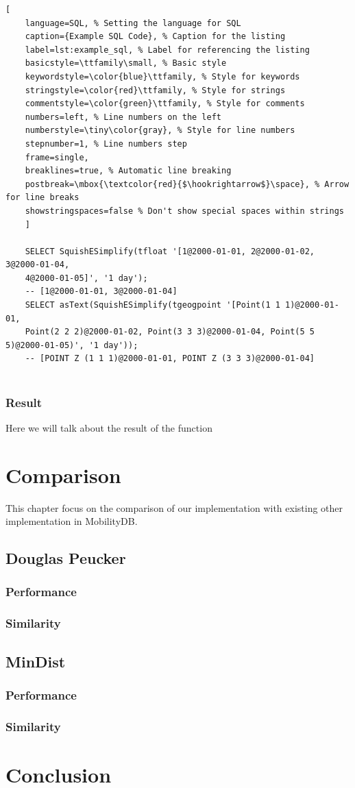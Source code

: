\documentclass[twoside,12pt, a4paper]{report}
\begin{document}
\begin{lstlisting}[
	language=SQL, % Setting the language for SQL
	caption={Example SQL Code}, % Caption for the listing
	label=lst:example_sql, % Label for referencing the listing
	basicstyle=\ttfamily\small, % Basic style
	keywordstyle=\color{blue}\ttfamily, % Style for keywords
	stringstyle=\color{red}\ttfamily, % Style for strings
	commentstyle=\color{green}\ttfamily, % Style for comments
	numbers=left, % Line numbers on the left
	numberstyle=\tiny\color{gray}, % Style for line numbers
	stepnumber=1, % Line numbers step
	frame=single,
	breaklines=true, % Automatic line breaking
	postbreak=\mbox{\textcolor{red}{$\hookrightarrow$}\space}, % Arrow for line breaks
	showstringspaces=false % Don't show special spaces within strings
	]
	
	SELECT SquishESimplify(tfloat '[1@2000-01-01, 2@2000-01-02, 3@2000-01-04,
	4@2000-01-05]', '1 day');
	-- [1@2000-01-01, 3@2000-01-04]
	SELECT asText(SquishESimplify(tgeogpoint '[Point(1 1 1)@2000-01-01,
	Point(2 2 2)@2000-01-02, Point(3 3 3)@2000-01-04, Point(5 5 5)@2000-01-05)', '1 day'));
	-- [POINT Z (1 1 1)@2000-01-01, POINT Z (3 3 3)@2000-01-04]
	
\end{lstlisting}

\subsection{Result}

Here we will talk about the result of the function

\chapter{Comparison}
This chapter focus on the comparison of our implementation with existing other implementation in MobilityDB.

\section{Douglas Peucker}
\subsection{Performance}
\subsection{Similarity}

\section{MinDist}
\subsection{Performance}
\subsection{Similarity}

\chapter{Conclusion}

\newpage
\printbibliography
%
%
\end{document}
